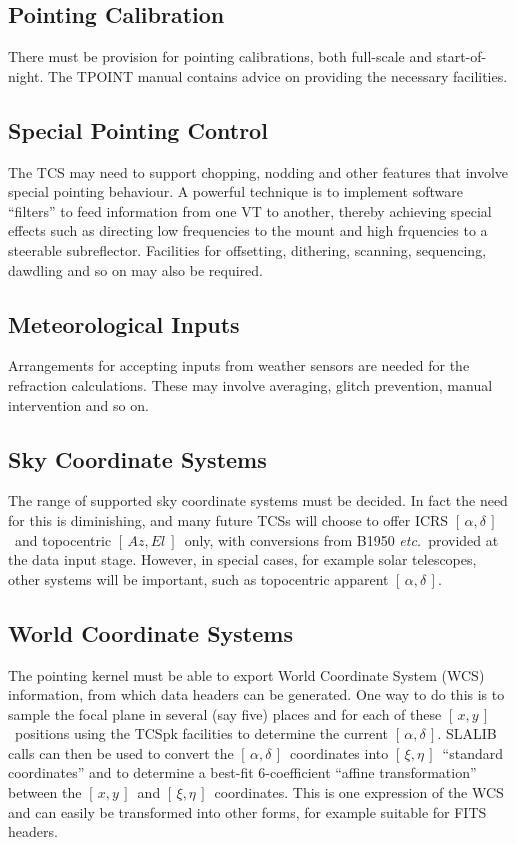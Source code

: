 \documentclass[12pt,fleqn,twoside]{article}
\renewcommand{\_}{{\tt\char'137}}     %
\newcommand{\radec}     {$[\,\alpha,\delta\,]$}
\newcommand{\xieta}     {$[\,\xi,\eta\,]$}
\newcommand{\azel}      {$[\,Az,El~]$}
\newcommand{\xy}        {$[\,x,y\,]$}
\begin{document}
\subsection{Pointing Calibration}

There must be provision for pointing calibrations, both
full-scale and start-of-night.  The TPOINT manual contains advice
on providing the necessary facilities.

\subsection{Special Pointing Control}

The TCS may need to support chopping, nodding and other
features that involve special pointing behaviour.  A
powerful technique is to implement software ``filters'' to feed
information from one VT to another, thereby achieving special
effects such as directing low frequencies to the mount and
high frquencies to a steerable subreflector.  Facilities for offsetting,
dithering, scanning, sequencing, dawdling and so on may also be
required.

\subsection{Meteorological Inputs}

Arrangements for accepting inputs from weather sensors are
needed for the refraction calculations.  These may involve
averaging, glitch prevention, manual intervention and so on.

\subsection{Sky Coordinate Systems}

The range of supported sky coordinate systems must be decided.  In
fact the need for this is diminishing, and many
future TCSs will choose to offer ICRS \radec\ and
topocentric \azel\ only, with conversions from B1950 {\it etc.}\
provided at the data input stage.  However, in special cases, for
example solar telescopes, other systems will be important, such as
topocentric apparent \radec.

\subsection{World Coordinate Systems}

The pointing kernel must be able to export World
Coordinate System (WCS) information,
from which data headers can be generated.  One way
to do this is to sample the focal plane in several (say five) places
and for each of these \xy\ positions using the TCSpk facilities
to determine the current \radec.  SLALIB calls can then be used to
convert the \radec\ coordinates into \xieta\ ``standard coordinates''
and to determine a best-fit 6-coefficient ``affine transformation''
between the \xy\ and \xieta\ coordinates.  This is one expression of
the WCS and can easily be transformed into other forms, for example
suitable for FITS headers.
\end{document}
